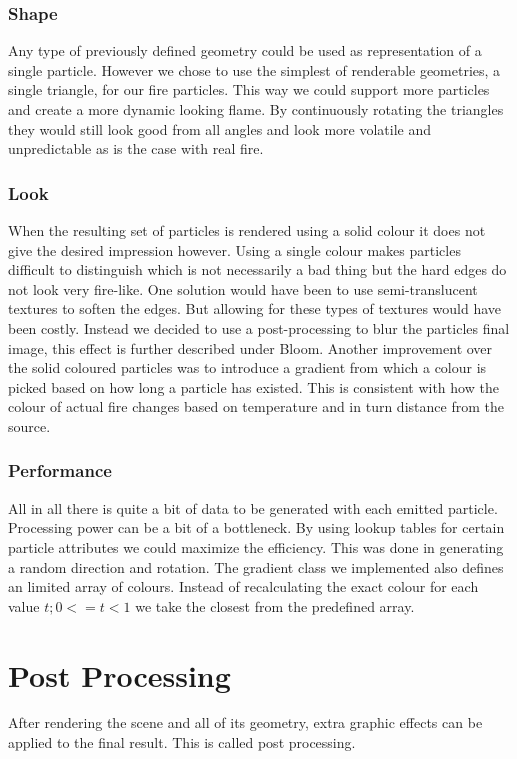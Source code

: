 \subsubsection{Shape}
Any type of previously defined geometry could be used as representation of a single particle. However we chose to use the simplest of renderable geometries, a single triangle, for our fire particles. This way we could support more particles and create a more dynamic looking flame. By continuously rotating the triangles they would still look good from all angles and look more volatile and unpredictable as is the case with real fire.

\subsubsection{Look}
When the resulting set of particles is rendered using a solid colour it does not give the desired impression however. Using a single colour makes particles difficult to distinguish which is not necessarily a bad thing but the hard edges do not look very fire-like. One solution would have been to use semi-translucent textures to soften the edges. But allowing for these types of textures would have been costly. Instead we decided to use a post-processing to blur the particles final image, this effect is further described under Bloom. Another improvement over the solid coloured particles was to introduce a gradient from which a colour is picked based on how long a particle has existed. This is consistent with how the colour of actual fire changes based on temperature and in turn distance from the source.

\subsubsection{Performance}
All in all there is quite a bit of data to be generated with each emitted particle. Processing power can be a bit of a bottleneck. By using lookup tables for certain particle attributes we could maximize the efficiency. This was done in generating a random direction and rotation. The gradient class we implemented also defines an limited array of colours. Instead of recalculating the exact colour for each value $t ; 0 <= t < 1$ we take the closest from the predefined array.

\section{Post Processing}
After rendering the scene and all of its geometry, extra graphic effects can be applied to the final result. This is called post processing.
